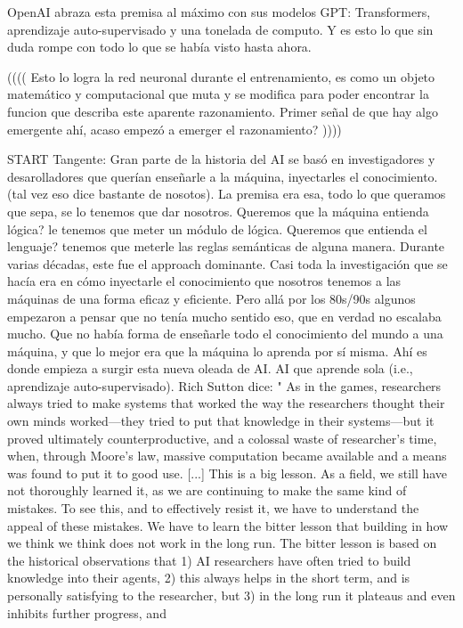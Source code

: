 OpenAI abraza esta premisa al máximo con sus modelos GPT: Transformers, aprendizaje auto-supervisado y una tonelada de computo. Y es esto
lo que sin duda rompe con todo lo que se había visto hasta ahora. 

((((
Esto lo logra la red neuronal durante el entrenamiento, es como un objeto matemático y computacional que muta y se modifica para poder
encontrar la funcion que describa este aparente razonamiento. Primer señal de que hay algo emergente ahí, acaso empezó a emerger el razonamiento?
))))


START Tangente:
Gran parte de la historia del AI se basó en investigadores y desarolladores que querían enseñarle a la máquina, inyectarles el conocimiento. 
(tal vez eso dice bastante de nosotos). La premisa era esa, todo lo que queramos que sepa, se lo tenemos que dar nosotros. Queremos que la 
máquina entienda lógica? le tenemos que meter un módulo de lógica. Queremos que entienda el lenguaje? tenemos que meterle las reglas semánticas de 
alguna manera. Durante varias décadas, este fue el approach dominante. Casi toda la investigación que se hacía era en cómo inyectarle el conocimiento 
que nosotros tenemos a las máquinas de una forma eficaz y eficiente. Pero allá por los 80s/90s algunos empezaron a pensar que no tenía mucho sentido
eso, que en verdad no escalaba mucho. Que no había forma de enseñarle todo el conocimiento del mundo a una máquina, y que lo mejor era que la máquina
lo aprenda por sí misma. Ahí es donde empieza a surgir esta nueva oleada de AI. AI que aprende sola (i.e., aprendizaje auto-supervisado). 
Rich Sutton dice: 
"
As in the games, researchers always tried to make systems that worked the way the researchers thought their own minds 
worked---they tried to put that knowledge in their systems---but it proved ultimately counterproductive, and a colossal 
waste of researcher's time, when, through Moore's law, massive computation became available and a means was found to put it to good use.
[...]
This is a big lesson. As a field, we still have not thoroughly learned it, as we are continuing to make the same kind of mistakes. 
To see this, and to effectively resist it, we have to understand the appeal of these mistakes. We have to learn the bitter lesson
that building in how we think we think does not work in the long run. The bitter lesson is based on the historical observations 
that 1) AI researchers have often tried to build knowledge into their agents, 2) this always helps in the short term, and is 
personally satisfying to the researcher, but 3) in the long run it plateaus and even inhibits further progress, and 
